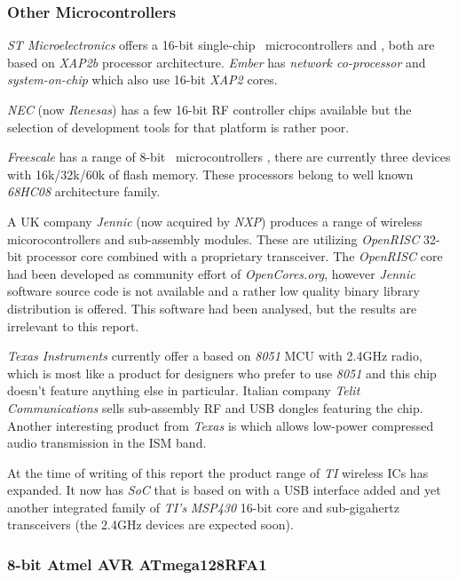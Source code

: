 \subsubsection{Other Microcontrollers}

 \emph{ST Microelectronics} offers a 16-bit single-chip \WPAN\
 microcontrollers  and , both are based
 on \emph{XAP2b} processor architecture. \emph{Ember} has 
 \emph{network co-processor} and \Chip{EM250} \emph{system-on-chip}
 which also use 16-bit \emph{XAP2} cores.

 \emph{NEC} (now \emph{Renesas}) has a few 16-bit RF controller chips
 available but the selection of development tools for that platform is
 rather poor.

 \emph{Freescale} has a range of 8-bit \WPAN\ microcontrollers
 , there are currently three devices with 16k/32k/60k
 of flash memory. These processors belong to well known \emph{68HC08}
 architecture family.

 A UK company \emph{Jennic} (now acquired by \emph{NXP}) produces a
 range of wireless micorocontrollers and sub-assembly modules. These
 are utilizing \emph{OpenRISC} 32-bit processor core combined with a
 proprietary transceiver. The \emph{OpenRISC} core had been developed
 as community effort of \emph{OpenCores.org}, however \emph{Jennic}
 software source code is not available and a rather low quality binary
 library distribution is offered. This software had been analysed, but
 the results are irrelevant to this report.

 \emph{Texas Instruments} currently offer a  based on
 \emph{8051} MCU with 2.4GHz radio, which is most like a product for
 designers who prefer to use \emph{8051} and this chip doesn't feature
 anything else in particular. Italian company \emph{Telit Communications}
 sells sub-assembly RF and USB dongles featuring the \Chip{CC2530} chip.
 Another interesting product from \emph{Texas} is \Chip{CC8520} which
 allows low-power compressed audio transmission in the ISM band.

 At the time of writing of this report the product range of \emph{TI}
 wireless ICs has expanded. It now has \Chip{CC2511} \emph{SoC}
 that is based on  with a USB interface added and
 yet another integrated family of \emph{TI's} \emph{MSP430} 16-bit
 core and sub-gigahertz \Chip{CC1101} transceivers (the 2.4GHz devices
 are expected soon).

\subsubsection{8-bit Atmel AVR ATmega128RFA1}

